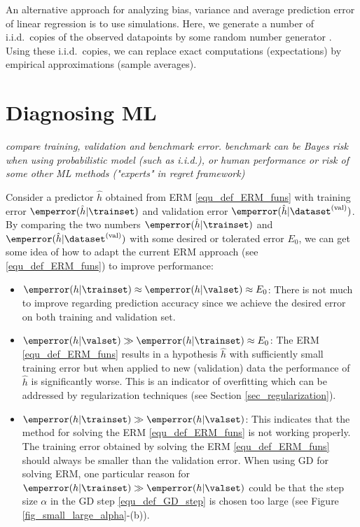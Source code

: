\documentclass[12pt]{report}
\begin{document}
An alternative approach for analyzing bias, variance and average 
prediction error of linear regression is to use simulations. Here, we 
generate a number of i.i.d.\ copies of the observed datapoints by 
some random number generator \cite{Andrieu2001}. Using these 
i.i.d.\ copies, we can replace exact computations (expectations) 
by empirical approximations (sample averages).  


\section{Diagnosing ML} 
\emph{compare training, validation and benchmark error. benchmark can 
be Bayes risk when using probabilistic model (such as i.i.d.), or human 
performance or risk of some other ML methods ("experts" in regret framework)  }

Consider a predictor $\hat{h}$ obtained from ERM \eqref{equ_def_ERM_funs} 
with training error $\emperror(\hat{h}| \trainset)$ and validation 
error $\emperror(\hat{h}| \dataset^{(\rm val)})$. By comparing 
the two numbers $\emperror(\hat{h}| \trainset)$ and $\emperror(\hat{h}| \dataset^{(\rm val)})$ 
with some desired or tolerated error $E_{0}$, we can get 
some idea of how to adapt the current ERM approach 
(see \eqref{equ_def_ERM_funs}) to improve performance: 
\begin{itemize} 
\item $\emperror(h| \trainset) \approx \emperror(h| \valset) \approx E_{0}$: 
There is not much to improve regarding prediction accuracy since we 
achieve the desired error on both training and validation set.
\item $\emperror(h| \valset) \gg \emperror(h| \trainset) \approx E_{0}$: 
The ERM \eqref{equ_def_ERM_funs} results in a hypothesis $\hat{h}$ 
with sufficiently small training error but when applied to new (validation) 
data the performance of $\hat{h}$ is significantly worse. This is an 
indicator of overfitting which can be addressed by regularization 
techniques (see Section \ref{sec_regularization}). 
\item $\emperror(h| \trainset) \gg \emperror(h| \valset)$: 
This indicates that the method for solving the ERM \eqref{equ_def_ERM_funs} 
is not working properly. The training error obtained by solving the 
ERM \eqref{equ_def_ERM_funs} should always be smaller than the 
validation error. When using GD for solving ERM, one particular 
reason for $\emperror(h| \trainset) \gg \emperror(h| \valset)$ 
could be that the step size $\alpha$ in the GD step \eqref{equ_def_GD_step} 
is chosen too large (see Figure \ref{fig_small_large_alpha}-(b)). 
\end{itemize}
\end{document}
